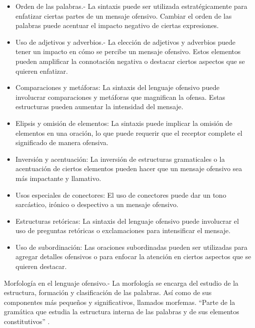 \begin{itemize}
		\item Orden de las palabras.- La sintaxis puede ser utilizada estratégicamente para enfatizar ciertas partes de un mensaje ofensivo. Cambiar el orden de las palabras puede acentuar el impacto negativo de ciertas expresiones.
		
		\item Uso de adjetivos y adverbios.- La elección de adjetivos y adverbios puede tener un impacto en cómo se percibe un mensaje ofensivo. Estos elementos pueden amplificar la connotación negativa o destacar ciertos aspectos que se quieren enfatizar.
		
		\item Comparaciones y metáforas: La sintaxis del lenguaje ofensivo puede involucrar comparaciones y metáforas que magnifican la ofensa. Estas estructuras pueden aumentar la intensidad del mensaje.
		
		\item Elipsis y omisión de elementos: La sintaxis puede implicar la omisión de elementos en una oración, lo que puede requerir que el receptor complete el significado de manera ofensiva.
		
		\item Inversión y acentuación: La inversión de estructuras gramaticales o la acentuación de ciertos elementos pueden hacer que un mensaje ofensivo sea más impactante y llamativo.
		
		\item Usos especiales de conectores: El uso de conectores puede dar un tono sarcástico, irónico o despectivo a un mensaje ofensivo.
		
		\item Estructuras retóricas: La sintaxis del lenguaje ofensivo puede involucrar el uso de preguntas retóricas o exclamaciones para intensificar el mensaje.
		
		\item Uso de subordinación: Las oraciones subordinadas pueden ser utilizadas para agregar detalles ofensivos o para enfocar la atención en ciertos aspectos que se quieren destacar.
		
\end{itemize}

Morfología en el lenguaje ofensivo.- La morfología se encarga del estudio de la estructura, formación y clasificación de las palabras. Así como de sus componentes más pequeños y significativos, llamados morfemas. ``Parte de la gramática que estudia la estructura interna de las palabras y de sus elementos constitutivos'' \cite[``Morfologia'' definicion 4]{rae2023Online}.

